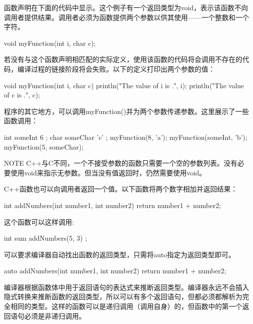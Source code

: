函数声明在下面的代码中显示。这个例子有一个返回类型为void，表示该函数不向调用者提供结果。调用者必须为函数提供两个参数以供其使用——一个整数和一个字符。

\begin{cpp}
void myFunction(int i, char c);
\end{cpp}

若没有与这个函数声明相匹配的实际定义，使用该函数的代码将会调用不存在的代码，编译过程的链接阶段将会失败。以下的定义打印出两个参数的值：

\begin{cpp}
void myFunction(int i, char c)
{
    println("The value of i is {}.", i);
    println("The value of c is {}.", c);
}
\end{cpp}

程序的其它地方，可以调用myFunction()并为两个参数传递参数。这里展示了一些函数调用：

\begin{cpp}
int someInt { 6 };
char someChar { 'c' };
myFunction(8, 'a');
myFunction(someInt, 'b');
myFunction(5, someChar);
\end{cpp}

\begin{myNotic}{NOTE}
C++与C不同，一个不接受参数的函数只需要一个空的参数列表。没有必要使用void来指示无参数。但当没有值返回时，仍然需要使用void。
\end{myNotic}

C++函数也可以向调用者返回一个值。以下函数将两个数字相加并返回结果：

\begin{cpp}
int addNumbers(int number1, int number2)
{
    return number1 + number2;
}
\end{cpp}

这个函数可以这样调用:

\begin{cpp}
int sum { addNumbers(5, 3) };
\end{cpp}


可以要求编译器自动找出函数的返回类型，只需将auto指定为返回类型即可。

\begin{cpp}
auto addNumbers(int number1, int number2)
{
    return number1 + number2;
}
\end{cpp}

编译器根据函数体中用于返回语句的表达式来推断返回类型。编译器永远不会插入隐式转换来推断函数的返回类型，所以可以有多个返回语句，但都必须都解析为完全相同的类型。这样的函数可以是递归调用（调用自身）的，但函数中的第一个返回语句必须是非递归调用。

